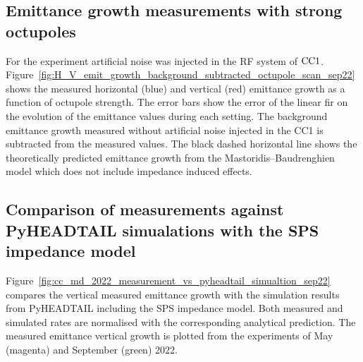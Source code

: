\subsection{Emittance growth measurements with strong octupoles}\label{subsec:cc_md_sep}
For the experiment artificial noise was injected in the RF system of ${\mathrm{CC}}1$. 
Figure~\ref{fig:H_V_emit_growth_background_subtracted_octupole_scan_sep22} shows the measured horizontal (blue) and vertical (red) emittance growth as a function of octupole strength. The error bars show the error of the linear fir on the evolution of the emittance values during each setting. The background emittance growth measured without artificial noise injected in the CC1 is subtracted from the measured values. The black dashed horizontal line shows the theoretically predicted emittance growth from the Mastoridis--Baudrenghien model which does not include impedance induced effects.

\subsection{Comparison of measurements against PyHEADTAIL simualations with the SPS impedance model}\label{subsec:comparison_with_pyheadtail_full_scan}
Figure~\ref{fig:cc_md_2022_measurement_vs_pyheadtail_simualtion_sep22} compares the vertical measured emittance growth with the simulation results from PyHEADTAIL including the SPS impedance model. Both measured and simulated rates are normalised with the corresponding analytical prediction. The measured emittance vertical growth is plotted from the experiments of May (magenta) and September (green) 2022.

